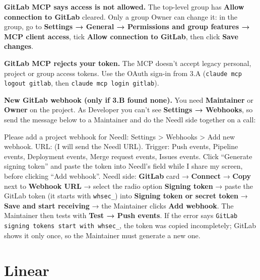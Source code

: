 \documentclass[11pt,a4paper]{article}
\newcommand{\ui}[1]{\textbf{#1}}
\newcommand{\lit}[1]{\texttt{#1}}
\newenvironment{prompt}{\def\FrameCommand{\fboxsep=6pt\fcolorbox{Gray}{okbg}}\MakeFramed{\advance\hsize-\width\FrameRestore}\raggedright}{\endMakeFramed}
\begin{document}
\textbf{GitLab MCP says access is not allowed.} The top-level group has \ui{Allow connection to GitLab} cleared. Only a group Owner can change it: in the group, go to \ui{Settings → General → Permissions and group features → MCP client access}, tick \ui{Allow connection to GitLab}, then click \ui{Save changes}.

\textbf{GitLab MCP rejects your token.} The MCP doesn't accept legacy personal, project or group access tokens. Use the OAuth sign-in from 3.A (\lit{claude mcp logout gitlab}, then \lit{claude mcp login gitlab}).

\textbf{New GitLab webhook (only if 3.B found none).} You need \textbf{Maintainer} or \textbf{Owner} on the project. As Developer you can't see \ui{Settings → Webhooks}, so send the message below to a Maintainer and do the Needl side together on a call:
\begin{prompt}
Please add a project webhook for Needl: Settings > Webhooks > Add new webhook. URL: (I will send the Needl URL). Trigger: Push events, Pipeline events, Deployment events, Merge request events, Issues events. Click “Generate signing token” and paste the token into Needl's field while I share my screen, before clicking “Add webhook”.
\end{prompt}
Needl side: \ui{GitLab} card → \ui{Connect} → \ui{Copy} next to \ui{Webhook URL} → select the radio option \ui{Signing token} → paste the GitLab token (it starts with \lit{whsec\_}) into \ui{Signing token or secret token} → \ui{Save and start receiving} → the Maintainer clicks \ui{Add webhook}. The Maintainer then tests with \ui{Test → Push events}. If the error says \lit{GitLab signing tokens start with whsec\_}, the token was copied incompletely; GitLab shows it only once, so the Maintainer must generate a new one.

\clearpage
\section{Linear}
\end{document}
